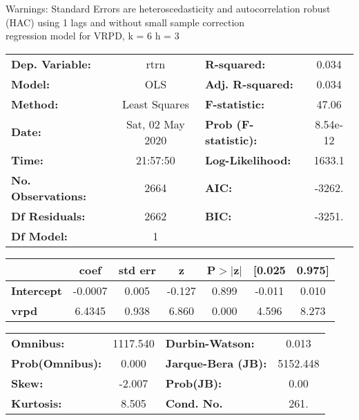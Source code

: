 Warnings: \newline
 [1] Standard Errors are heteroscedasticity and autocorrelation robust (HAC) using 1 lags and without small sample correction\\ 

regression model for VRPD, k = 6 h = 3\begin{center}
\begin{tabular}{lclc}
\toprule
\textbf{Dep. Variable:}    &       rtrn       & \textbf{  R-squared:         } &     0.034   \\
\textbf{Model:}            &       OLS        & \textbf{  Adj. R-squared:    } &     0.034   \\
\textbf{Method:}           &  Least Squares   & \textbf{  F-statistic:       } &     47.06   \\
\textbf{Date:}             & Sat, 02 May 2020 & \textbf{  Prob (F-statistic):} &  8.54e-12   \\
\textbf{Time:}             &     21:57:50     & \textbf{  Log-Likelihood:    } &    1633.1   \\
\textbf{No. Observations:} &        2664      & \textbf{  AIC:               } &    -3262.   \\
\textbf{Df Residuals:}     &        2662      & \textbf{  BIC:               } &    -3251.   \\
\textbf{Df Model:}         &           1      & \textbf{                     } &             \\
\bottomrule
\end{tabular}
\begin{tabular}{lcccccc}
                   & \textbf{coef} & \textbf{std err} & \textbf{z} & \textbf{P$> |$z$|$} & \textbf{[0.025} & \textbf{0.975]}  \\
\midrule
\textbf{Intercept} &      -0.0007  &        0.005     &    -0.127  &         0.899        &       -0.011    &        0.010     \\
\textbf{vrpd}      &       6.4345  &        0.938     &     6.860  &         0.000        &        4.596    &        8.273     \\
\bottomrule
\end{tabular}
\begin{tabular}{lclc}
\textbf{Omnibus:}       & 1117.540 & \textbf{  Durbin-Watson:     } &    0.013  \\
\textbf{Prob(Omnibus):} &   0.000  & \textbf{  Jarque-Bera (JB):  } & 5152.448  \\
\textbf{Skew:}          &  -2.007  & \textbf{  Prob(JB):          } &     0.00  \\
\textbf{Kurtosis:}      &   8.505  & \textbf{  Cond. No.          } &     261.  \\
\bottomrule
\end{tabular}
\end{center}

